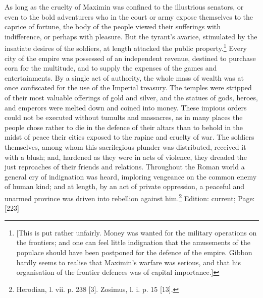 As long as the cruelty of Maximin was confined to the illustrious senators, or even to the bold adventurers who in the court or army expose themselves to the caprice of fortune, the body of the people viewed their sufferings with indifference, or perhaps with pleasure. But the tyrant\texthebrew{}’s avarice, stimulated by the insatiate desires of the soldiers, at length attacked the public property.\footnote{[This is put rather unfairly. Money was wanted for the military operations on the frontiers; and one can feel little indignation that the amusements of the populace should have been postponed for the defence of the empire. Gibbon hardly seems to realise that Maximin\texthebrew{}’s warfare was serious, and that his organisation of the frontier defences was of capital importance.]} Every city of the empire was possessed of an independent revenue, destined to purchase corn for the multitude, and to supply the expenses of the games and entertainments. By a single act of authority, the whole mass of wealth was at once confiscated for the use of the Imperial treasury. The temples were stripped of their most valuable offerings of gold and silver, and the statues of gods, heroes, and emperors were melted down and coined into money. These impious orders could not be executed without tumults and massacres, as in many places the people chose rather to die in the defence of their altars than to behold in the midst of peace their cities exposed to the rapine and cruelty of war. The soldiers themselves, among whom this sacrilegious plunder was distributed, received it with a blush; and, hardened as they were in acts of violence, they dreaded the just reproaches of their friends and relations. Throughout the Roman world a general cry of indignation was heard, imploring vengeance on the common enemy of human kind; and at length, by an act of private oppression, a peaceful and unarmed province was driven into rebellion against him.\footnote{Herodian, l. vii. p. 238 [3]. Zosimus, l. i. p. 15 [13].}
Edition: current; Page: [223]

